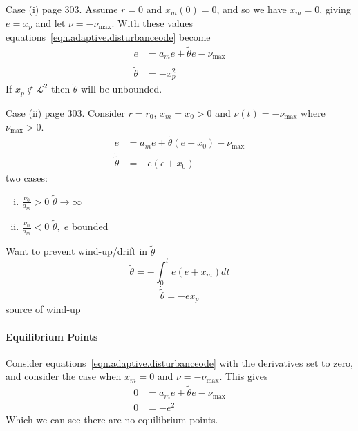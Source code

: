 \begin{example}
  Case (i) page 303.
  Assume $r=0$ and $x_{m}(0)=0$, and so we have $x_{m}=0$, giving $e=x_{p}$ and let $\nu=-\nu_{\text{max}}$.
  With these values equations~\eqref{eqn.adaptive.disturbanceode} become
  \begin{align*}
    \dot{e}&=a_{m}e+\tilde{\theta}e-\nu_{\text{max}} \\
    \dot{\tilde{\theta}}&=-x_{p}^{2}
  \end{align*}
  If $x_{p}\notin\mathcal{L}^{2}$ then $\tilde{\theta}$ will be unbounded.
\end{example}

\begin{example}
  Case (ii) page 303.
  Consider $r=r_{0}$, $x_{m}=x_{0}>0$ and $\nu(t)=-\nu_{\text{max}}$ where $\nu_{\text{max}}>0$.
  \begin{align*}
    \dot{e}&=a_{m}e+\tilde{\theta}(e+x_{0})-\nu_{\text{max}} \\
    \dot{\tilde{\theta}}&=-e(e+x_{0})
  \end{align*}
  two cases:
  \begin{enumerate}[(i)]
    \item{$\frac{\nu_{0}}{a_{m}}>0$ $\tilde{\theta}\rightarrow\infty$}
    \item{$\frac{\nu_{0}}{a_{m}}<0$ $\tilde{\theta},\;e$ bounded}
  \end{enumerate}
  Want to prevent wind-up/drift in $\tilde{\theta}$
  \begin{equation*}
    \tilde{\theta}=-\int_{0}^{t}e(e+x_{m})dt
  \end{equation*}
  \begin{equation*}
    \dot{\tilde{\theta}}=-ex_{p}
  \end{equation*}
  source of wind-up
\end{example}

\paragraph{Equilibrium Points}
Consider equations~\eqref{eqn.adaptive.disturbanceode} with the derivatives set to zero, and consider the case when $x_{m}=0$ and $\nu=-\nu_{\text{max}}$.
This gives
\begin{align*}
0&=a_{m}e+\tilde{\theta}e-\nu_{\text{max}} \\
0&=-e^{2}
\end{align*}
Which we can see there are no equilibrium points.

